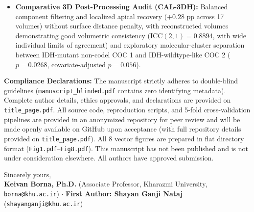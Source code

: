 \documentclass[10pt,a4paper]{article}
\begin{document}
\begin{itemize}
    \item \textbf{Comparative 3D Post-Processing Audit (CAL-3DH):} Balanced component filtering and localized apical recovery ($+0.28\text{ pp}$ across 17 volumes) without surface distance penalty, with reconstructed volumes demonstrating good volumetric consistency ($\text{ICC}(2,1) = 0.8894$, with wide individual limits of agreement) and exploratory molecular-cluster separation between IDH-mutant non-codel COC 1 and IDH-wildtype-like COC 2 ($p = 0.0268$, covariate-adjusted $p = 0.056$).
\end{itemize}

\vspace{0.05em}
\noindent\textbf{Compliance Declarations:}
The manuscript strictly adheres to double-blind guidelines (\texttt{manuscript\_blinded.pdf} contains zero identifying metadata). Complete author details, ethics approvals, and declarations are provided on \texttt{title\_page.pdf}. All source code, reproduction scripts, and 5-fold cross-validation pipelines are provided in an anonymized repository for peer review and will be made openly available on GitHub upon acceptance (with full repository details provided on \texttt{title\_page.pdf}). All 8 vector figures are prepared in flat directory format (\texttt{Fig1.pdf}--\texttt{Fig8.pdf}). This manuscript has not been published and is not under consideration elsewhere. All authors have approved submission.

\vspace{0.04em}
\noindent Sincerely yours, \\[0.08em]
\textbf{Keivan Borna, Ph.D.} (Associate Professor, Kharazmi University, \texttt{borna@khu.ac.ir}) \quad $\cdot$ \quad \textbf{First Author: Shayan Ganji Nataj} (\texttt{shayanganji@khu.ac.ir})
\end{document}
